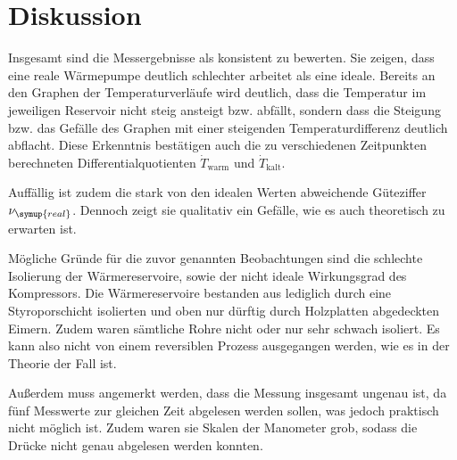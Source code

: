 \section{Diskussion}
\label{sec:Diskussion}

Insgesamt sind die Messergebnisse als konsistent zu bewerten. Sie zeigen, dass eine
reale Wärmepumpe deutlich schlechter arbeitet als eine ideale.
Bereits an den Graphen der Temperaturverläufe wird deutlich, dass die Temperatur
im jeweiligen Reservoir nicht steig ansteigt bzw. abfällt, sondern dass die
Steigung bzw. das Gefälle des Graphen mit einer steigenden Temperaturdifferenz
deutlich abflacht. Diese Erkenntnis bestätigen auch die zu verschiedenen Zeitpunkten
berechneten Differentialquotienten $\dot{T}_\text{warm}$ und $\dot{T}_\text{kalt}$.

Auffällig ist zudem die stark von den idealen Werten abweichende Güteziffer $\nu_{\symup{real}}$.
Dennoch zeigt sie qualitativ ein Gefälle, wie es auch theoretisch zu erwarten ist.

Mögliche Gründe für die zuvor genannten Beobachtungen sind die schlechte Isolierung der Wärmereservoire, sowie
der nicht ideale Wirkungsgrad des Kompressors. Die Wärmereservoire bestanden
aus lediglich durch eine Styroporschicht isolierten und oben nur dürftig durch Holzplatten
abgedeckten Eimern. Zudem waren sämtliche Rohre nicht oder nur sehr schwach isoliert.
Es kann also nicht von einem reversiblen Prozess ausgegangen werden, wie es in der
Theorie der Fall ist.

Außerdem muss angemerkt werden, dass die Messung insgesamt ungenau ist, da fünf Messwerte
zur gleichen Zeit abgelesen werden sollen, was jedoch praktisch nicht möglich ist.
Zudem waren sie Skalen der Manometer grob, sodass die Drücke nicht genau abgelesen
werden konnten.
